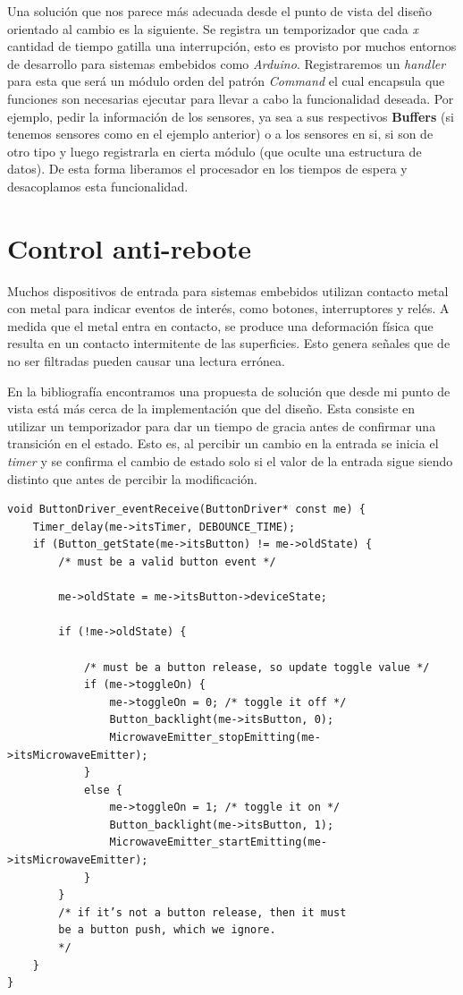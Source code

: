 Una solución que nos parece más adecuada desde el punto de vista del diseño orientado al cambio es la siguiente. Se registra un temporizador que cada \textit{x} cantidad de tiempo gatilla una interrupción, esto es provisto por muchos entornos de desarrollo para sistemas embebidos como \textit{Arduino}.
Registraremos un \textit{handler} para esta que será un módulo orden del patrón  \textit{Command} el cual encapsula que funciones son necesarias ejecutar para llevar a cabo la funcionalidad deseada. Por ejemplo, pedir la información de los sensores, ya sea a sus respectivos \textbf{Buffers} (si tenemos sensores como en el ejemplo anterior) o a los sensores en si, si son de otro tipo y luego registrarla en cierta módulo (que oculte una estructura de datos). De esta forma liberamos el procesador en los tiempos de espera y desacoplamos esta funcionalidad.



\section{Control anti-rebote}
Muchos dispositivos de entrada para sistemas embebidos utilizan contacto metal con metal para indicar eventos de interés, como botones, interruptores y relés. A medida que el metal entra en contacto, se produce una deformación física que resulta en un contacto intermitente de las superficies. Esto genera señales que de no ser filtradas pueden causar una lectura errónea. 

En la bibliografía encontramos una propuesta de solución que desde mi punto de vista está más cerca de la implementación que del diseño. Esta consiste en utilizar un temporizador para dar un tiempo de gracia antes de confirmar una transición en el estado. Esto es, al percibir un cambio en la entrada se inicia el \textit{timer} y se confirma el cambio de estado solo si el valor de la entrada sigue siendo distinto que antes de percibir la modificación. 

\begin{lstlisting}[caption=Código ejemplo]
void ButtonDriver_eventReceive(ButtonDriver* const me) {
    Timer_delay(me->itsTimer, DEBOUNCE_TIME);
    if (Button_getState(me->itsButton) != me->oldState) {
        /* must be a valid button event */
        
        me->oldState = me->itsButton->deviceState;
        
        if (!me->oldState) {
            
            /* must be a button release, so update toggle value */
            if (me->toggleOn) {
                me->toggleOn = 0; /* toggle it off */
                Button_backlight(me->itsButton, 0);
                MicrowaveEmitter_stopEmitting(me->itsMicrowaveEmitter);
            }
            else {
                me->toggleOn = 1; /* toggle it on */
                Button_backlight(me->itsButton, 1);
                MicrowaveEmitter_startEmitting(me->itsMicrowaveEmitter);
            }
        }
        /* if it’s not a button release, then it must
        be a button push, which we ignore.
        */
    }
}
\end{lstlisting}

